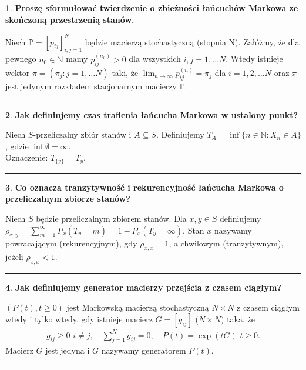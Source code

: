 \documentclass[
    twocolumn,
    twoside,
    fontsize=11pt,
    paper=A0,
    DIV=30
]{scrartcl}
\theoremstyle{definition}
\newtheorem{pytanie}{}
\theoremstyle{break}
\newenvironment{odpowiedź}{\vspace{-0.7em}}{\vspace{0.3em}\hrule}
\begin{document}
\begin{pytanie}
\textbf{Proszę sformułować twierdzenie o zbieżności łańcuchów Markowa ze skończoną przestrzenią stanów.}
\end{pytanie}
\begin{odpowiedź}
    Niech $\mathbb{P} = [p_{ij}]_{i,j=1}^N$
    będzie macierzą stochastyczną (stopnia  N).
    Załóżmy, że dla pewnego $n_0\in \mathbb{N}$
    mamy $p_{ij}^{(n_0)} > 0$ dla wszystkich $i, j=1, \ldots N$.
    Wtedy istnieje wektor $\pi = (\pi_j: j = 1, \ldots N)$
    taki, że $\lim_{n\to \infty}p^{(n)}_{ij} = \pi_j$ dla
    $i = 1, 2, \ldots N$ oraz $\pi$ jest jedynym rozkładem
    stacjonarnym macierzy $\mathbb{P}$.
\end{odpowiedź}


\begin{pytanie}
\textbf{Jak definiujemy czas trafienia łańcucha Markowa w ustalony punkt?}
\end{pytanie}
\begin{odpowiedź}
    Niech $S$-przeliczalny zbiór stanów i $A\subseteq S$.
    Definiujemy $T_A=\inf\{n\in \mathbb{N} : X_n\in A\}$,
    gdzie $\inf{\emptyset} = \infty$.\\
    Oznaczenie: $T_{\{y\}} = T_y$.
\end{odpowiedź}

\begin{pytanie}
\textbf{Co oznacza tranzytywność i rekurencyjność łańcucha Markowa o przeliczalnym zbiorze stanów?}
\end{pytanie}
\begin{odpowiedź}
    Niech $S$ będzie przeliczalnym zbiorem stanów.
    Dla $x, y \in S$ definiujemy
    $\rho_{x,y} = \sum_{m = 1}^\infty P_x(T_y = m) = 1 - P_x(T_y = \infty)$.
    Stan $x$ nazywamy powracającym (rekurencyjnym),
    gdy $\rho_{x,x} = 1$,
    a chwilowym (tranzytywnym), jeżeli $\rho_{x,x} < 1$.
\end{odpowiedź}


\begin{pytanie}
\textbf{Jak definiujemy generator macierzy przejścia z czasem ciągłym?}
\end{pytanie}
\begin{odpowiedź}
    $(P(t), t\geq 0)$ jest Markowską macierzą stochastyczną
    $N \times N$ z czasem ciągłym wtedy i tylko wtedy,
    gdy istnieje macierz $G= [g_{ij}]$ ($N\times N)$ taka, że
    \begin{gather}
        g_{ij} \geq 0 \,\, i \neq j, \quad
        \sum_{j=1}^N g_{ij} = 0, \quad
        P(t)=\exp(tG) \,\, t\geq 0.
    \end{gather}
    Macierz $G$ jest jedyna i $G$ nazywamy generatorem $P(t)$.
\end{odpowiedź}
\end{document}
